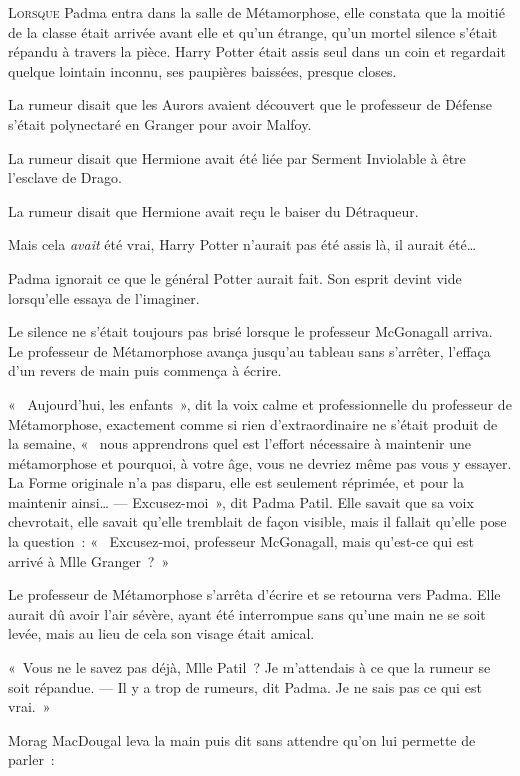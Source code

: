 
\lettrine{L}{orsque}  Padma entra dans la salle de Métamorphose, elle constata que la moitié de la classe était arrivée avant elle et qu'un étrange, qu'un mortel silence s'était répandu à travers la pièce. Harry Potter était assis seul dans un coin et regardait quelque lointain inconnu, ses paupières baissées, presque closes.

La rumeur disait que les Aurors avaient découvert que le professeur de Défense s'était polynectaré en Granger pour avoir Malfoy.

La rumeur disait que Hermione avait été liée par Serment Inviolable à être l'esclave de Drago.

La rumeur disait que Hermione avait reçu le baiser du Détraqueur.

Mais cela \emph{avait} été vrai, Harry Potter n'aurait pas été assis là, il aurait été…

Padma ignorait ce que le général Potter aurait fait. Son esprit devint vide lorsqu'elle essaya de l'imaginer.

Le silence ne s'était toujours pas brisé lorsque le professeur McGonagall arriva. Le professeur de Métamorphose avança jusqu'au tableau sans s'arrêter, l'effaça d'un revers de main puis commença à écrire.

«~ Aujourd'hui, les enfants~», dit la voix calme et professionnelle du professeur de Métamorphose, exactement comme si rien d'extraordinaire ne s'était produit de la semaine, «~ nous apprendrons quel est l'effort nécessaire à maintenir une métamorphose et pourquoi, à votre âge, vous ne devriez même pas vous y essayer. La Forme originale n'a pas disparu, elle est seulement réprimée, et pour la maintenir ainsi…
---  Excusez-moi~», dit Padma Patil. Elle savait que sa voix chevrotait, elle savait qu'elle tremblait de façon visible, mais il fallait qu'elle pose la question~: «~ Excusez-moi, professeur McGonagall, mais qu'est-ce qui est arrivé à Mlle Granger~?~»

Le professeur de Métamorphose s'arrêta d'écrire et se retourna vers Padma. Elle aurait dû avoir l'air sévère, ayant été interrompue sans qu'une main ne se soit levée, mais au lieu de cela son visage était amical.

«~Vous ne le savez pas déjà, Mlle Patil~? Je m'attendais à ce que la rumeur se soit répandue.
---  Il y a trop de rumeurs, dit Padma. Je ne sais pas ce qui est vrai.~»

Morag MacDougal leva la main puis dit sans attendre qu'on lui permette de parler~:

